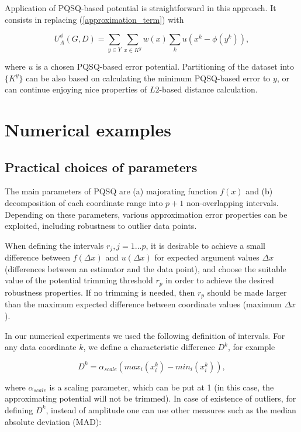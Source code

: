 \documentclass[preprint,12pt,twocolumn]{elsarticle}
\begin{document}
Application of PQSQ-based potential is straightforward in this approach. It consists
in replacing (\ref{approximation_term}) with

\begin{equation}\label{approximation_term_PQSQ}
U^{\phi}_A(G,D)= \sum_{y \in Y} \sum_{ x \in K^y} w(x) \sum_k u(x^k-
\phi(y^k)),\nonumber
\end{equation}

\noindent where $u$ is a chosen PQSQ-based error potential. Partitioning of the dataset
into $\{K^y\}$ can be also based on calculating the minimum PQSQ-based error to $y$, or can
continue enjoying nice properties of $L2$-based distance calculation.

\section{Numerical examples}

\subsection{Practical choices of parameters}

The main parameters of PQSQ are (a) majorating function $f(x)$ and (b) decomposition of each coordinate range into $p+1$ non-overlapping intervals.
Depending on these parameters, various approximation error properties can be exploited, including robustness to outlier data points.

When defining the intervals $r_j, j=1\dots p$, it is desirable to achieve a small difference between $f(\Delta x)$ and $u(\Delta x)$ for expected argument values $\Delta x$ (differences between an estimator and the data point), and choose the suitable value of the potential trimming threshold $r_p$ in order to achieve the desired robustness properties. If no trimming is needed, then $r_p$ should be made larger than the maximum expected difference between coordinate values (maximum $\Delta x$).

In our numerical experiments we used the following definition of intervals. For any data coordinate $k$, we define a characteristic difference $D^k$, for example

\begin{equation}\label{characteristic_distance_amplitude}
D^k = \alpha_{scale}(max_i(x_i^k)-min_i(x_i^k)),
\end{equation}

\noindent where $\alpha_{scale}$ is a scaling parameter, which can be put at 1 (in this case, the approximating potential will not be trimmed). In case of existence of outliers, for defining $D^k$, instead of amplitude one can use other measures such as the median absolute deviation (MAD):
\end{document}
